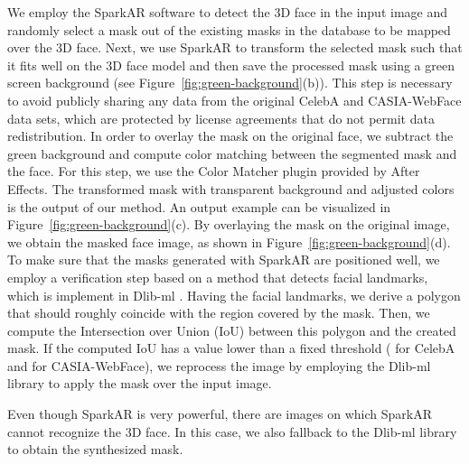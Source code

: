 \documentclass{article}
\begin{document}
We employ the SparkAR software to detect the 3D face in the input image and randomly select a mask out of the existing  masks in the database to be mapped over the 3D face.
Next, we use SparkAR to transform the selected mask such that it fits well on the 3D face model and then save the processed mask using a green screen background (see Figure~\ref{fig:green-background}(b)). This step is necessary to avoid publicly sharing any data from the original CelebA and CASIA-WebFace data sets, which are protected by license agreements that do not permit data redistribution. In order to overlay the mask on the original face, we subtract the green background and compute color matching between the segmented mask and the face. For this step, we use the Color Matcher plugin provided by After Effects. The transformed mask with transparent background and adjusted colors is the output of our method. An output example can be visualized in Figure~\ref{fig:green-background}(c). 
By overlaying the mask on the original image, we obtain the masked face image, as shown in Figure~\ref{fig:green-background}(d). To make sure that the masks generated with SparkAR are positioned well, we employ a verification step based on a method that detects facial landmarks, which is implement in Dlib-ml \cite{dlib-ml}. Having the facial landmarks, we derive a polygon that should roughly coincide with the region covered by the mask. Then, we compute the Intersection over Union (IoU) between this polygon and the created mask. If the computed IoU has a value lower than a fixed threshold ( for CelebA and  for CASIA-WebFace), we reprocess the image by employing the Dlib-ml library to apply the mask over the input image. 


Even though SparkAR is very powerful, there are images on which SparkAR cannot recognize the 3D face. In this case, we also fallback to the Dlib-ml library to obtain the synthesized mask.
\end{document}
